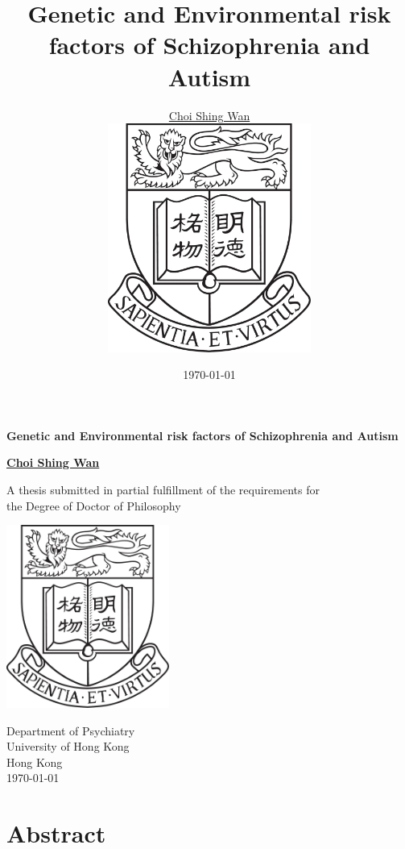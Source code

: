 \documentclass{book}
\title{Genetic and Environmental risk factors of Schizophrenia and Autism}
\date{\today}
\author{\href{mailto:choishingwan@gmail.com}{Choi Shing Wan}\\
	\includegraphics[width=0.5\textwidth]{hkuLogo.jpg}}
\begin{document}
\thispagestyle{empty}
\pagestyle{empty}

\begin{titlepage}
	\begin{center}
		\vspace*{1cm}
		
		\Huge
		\textbf{Genetic and Environmental risk factors of Schizophrenia and Autism}
		
		\vspace{0.5cm}
		\LARGE
		
		\vspace{1.5cm}
		
		\textbf{\href{mailto:choishingwan@gmail.com}{Choi Shing Wan}}
		
		\vfill
		
		A thesis submitted in partial fulfillment of the requirements for \\
		the Degree of Doctor of Philosophy
		
		\vspace{0.8cm}
		
		\includegraphics[width=0.4\textwidth]{hkuLogo.jpg}
		
		\Large
		Department of Psychiatry\\
		University of Hong Kong\\
		Hong Kong\\
		\today
		
	\end{center}
\end{titlepage}


\frontmatter 
	\cleardoublepage
	\chapter*{Abstract}
	\cleardoublepage
\end{document}
